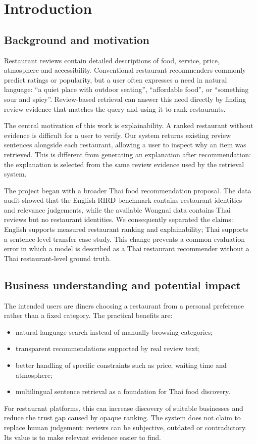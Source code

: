 \chapter{Introduction}

\section{Background and motivation}
Restaurant reviews contain detailed descriptions of food, service, price, atmosphere and
accessibility. Conventional restaurant recommenders commonly predict ratings or popularity,
but a user often expresses a need in natural language: ``a quiet place with outdoor seating'',
``affordable food'', or ``something sour and spicy''. Review-based retrieval can answer this
need directly by finding review evidence that matches the query and using it to rank restaurants.

The central motivation of this work is explainability. A ranked restaurant without evidence is
difficult for a user to verify. Our system returns existing review sentences alongside each
restaurant, allowing a user to inspect why an item was retrieved. This is different from
generating an explanation after recommendation: the explanation is selected from the same
review evidence used by the retrieval system.

The project began with a broader Thai food recommendation proposal. The data audit showed that
the English RIRD benchmark contains restaurant identities and relevance judgements, while the
available Wongnai data contains Thai reviews but no restaurant identities. We consequently
separated the claims: English supports measured restaurant ranking and explainability; Thai
supports a sentence-level transfer case study. This change prevents a common evaluation error
in which a model is described as a Thai restaurant recommender without a Thai restaurant-level
ground truth.

\section{Business understanding and potential impact}
The intended users are diners choosing a restaurant from a personal preference rather than a
fixed category. The practical benefits are:
\begin{itemize}
  \item natural-language search instead of manually browsing categories;
  \item transparent recommendations supported by real review text;
  \item better handling of specific constraints such as price, waiting time and atmosphere;
  \item multilingual sentence retrieval as a foundation for Thai food discovery.
\end{itemize}
For restaurant platforms, this can increase discovery of suitable businesses and reduce the
trust gap caused by opaque ranking. The system does not claim to replace human judgement:
reviews can be subjective, outdated or contradictory. Its value is to make relevant evidence
easier to find.

